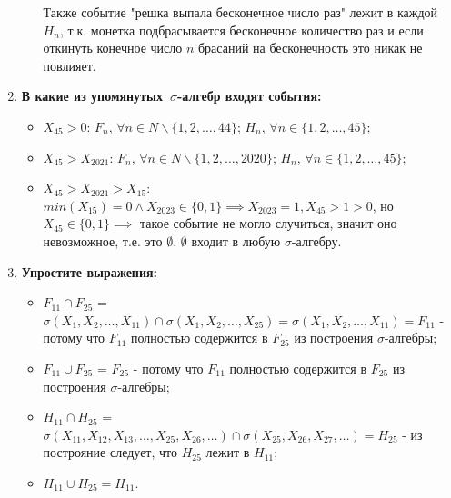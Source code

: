\documentclass{article}
\begin{document}
\begin{enumerate}
\begin{itemize}
Также событие "решка выпала бесконечное число раз"  лежит в каждой $H_n$, т.к. монетка подбрасывается бесконечное количество раз и если откинуть конечное число $n$ брасаний на бесконечность это никак не повлияет.
\end{itemize}
\item \textbf{В какие из упомянутых $\sigma$-алгебр входят события:}
\begin{itemize}
\item $X_{45}>0$: $F_n$, $\forall n \in N \backslash \{1,2,\dots,44\}$; $H_n$, $\forall n \in \{1,2,\dots,45\}$;
\item $X_{45}>X_{2021}$: $F_n$, $\forall n \in N \backslash \{1,2,\dots,2020\}$; $H_n$, $\forall n \in \{1,2,\dots,45\}$;
\item $X_{45}>X_{2021}>X_{15}$: $min(X_{15})=0 \land X_{2023} \in \{0,1\} \implies X_{2023} = 1, X_{45} > 1 > 0$, но $X_{45} \in \{0,1\} \implies$ такое событие не могло случиться, значит оно невозможное, т.е. это $\emptyset$. $\emptyset$ входит в любую $\sigma$-алгебру.
\end{itemize}
\item \textbf{Упростите выражения:}
\begin{itemize}
\item$F_{11}\cap F_{25}$ = $\sigma(X_1,X_2,…,X_{11}) \cap \sigma(X_1,X_2,…,X_{25}) = \sigma(X_1,X_2,…,X_{11}) = F_{11}$ - потому что $F_{11}$ полностью содержится в $F_{25}$ из построения $\sigma$-алгебры;
\item $F_{11} \cup F_{25}$ = $F_{25}$ - потому что $F_{11}$ полностью содержится в $F_{25}$ из построения $\sigma$-алгебры;
\item $H_{11} \cap H_{25}$ = $\sigma(X_{11},X_{12},X_{13},…, X_{25}, X_{26}, \dots) \cap \sigma(X_{25},X_{26},X_{27},…) = H_{25}$ - из построяние следует, что $H_{25}$ лежит в $H_{11}$;
\item $H_{11} \cup H_{25} = H_{11}$.
\end{itemize}
\end{enumerate}
\end{document}
